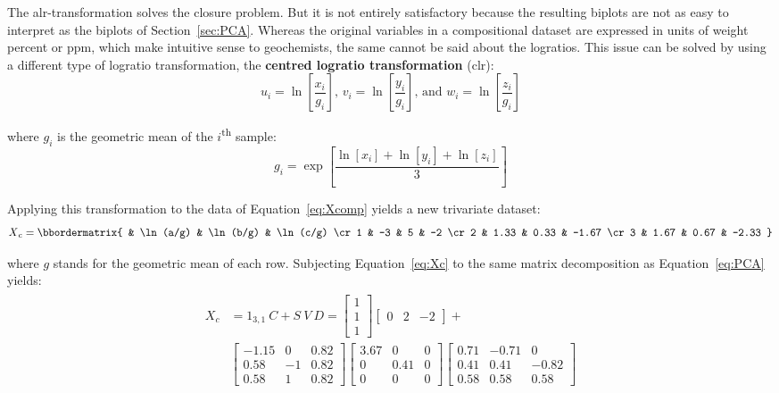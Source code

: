 The alr-transformation solves the closure problem. But it is not
entirely satisfactory because the resulting biplots are not as easy to
interpret as the biplots of Section~\ref{sec:PCA}. Whereas the
original variables in a compositional dataset are expressed in units
of weight percent or ppm, which make intuitive sense to geochemists,
the same cannot be said about the logratios. This issue can be solved
by using a different type of logratio transformation, the
\textbf{centred logratio transformation} (clr):
\begin{equation}
  u_i = \ln\!\left[\frac{x_i}{g_i}\right] \mbox{,~}
  v_i = \ln\!\left[\frac{y_i}{g_i}\right] \mbox{,~and~}
  w_i = \ln\!\left[\frac{z_i}{g_i}\right]
  \label{eq:clr}
\end{equation}

\noindent where $g_i$ is the geometric mean of the
$i$\textsuperscript{th} sample:
\[
g_i = \exp\!\left[\frac{\ln[x_i]+\ln[y_i]+\ln[z_i]}{3}\right]
\]

Applying this transformation to the data of Equation~\ref{eq:Xcomp}
yields a new trivariate dataset:
\begin{equation}
  X\textsubscript{c} =
  \bbordermatrix{ & \ln(a/g) & \ln(b/g) & \ln(c/g) \cr
    1 & -3 & 5 & -2 \cr
    2 & 1.33  & 0.33 & -1.67 \cr
    3 & 1.67  & 0.67 & -2.33
  }
  \label{eq:Xc}
\end{equation}

\noindent where $g$ stands for the geometric mean of each
row. Subjecting Equation~\ref{eq:Xc} to the same matrix decomposition
as Equation~\ref{eq:PCA} yields:  
\begin{align}
  \begin{split}
    X_c & = 1_{3,1}~C + S~V~D = \left[
      \begin{array}{c}
        1 \\
        1 \\
       1
      \end{array}
      \right]
   \left[
    \begin{array}{ccc}
        0 & 2 & -2
      \end{array}
      \right]
    + \\
    ~ & \left[
      \begin{array}{ccc}
        -1.15 &  0 & 0.82 \\
        0.58  & -1 & 0.82 \\
        0.58  &  1 & 0.82
      \end{array}
      \right]
    \left[
      \begin{array}{ccc}
        3.67 & 0 & 0 \\
        0 & 0.41 & 0 \\
        0 & 0 & 0
      \end{array}
      \right]
    \left[
      \begin{array}{ccc}
        0.71 & -0.71 &  0 \\
        0.41 &  0.41 & -0.82 \\
        0.58 &  0.58 &  0.58
      \end{array}
      \right]
    \label{eq:PCAcomp}
  \end{split}
\end{align}

